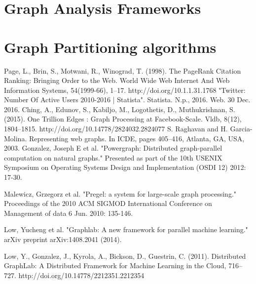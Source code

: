 \documentclass[12pt]{report}
\numberwithin{figure}{section}
\numberwithin{table}{section}
\begin{document}
\newpage
\begin{appendices}


\chapter{Graph Analysis Frameworks}



\chapter{Graph Partitioning algorithms}




\end{appendices}


\begin{thebibliography}{1}

   Page, L., Brin, S., Motwani, R.,  Winograd, T. (1998). The PageRank Citation Ranking: Bringing Order to the Web. World Wide Web Internet And Web Information Systems, 54(1999-66), 1–17. http://doi.org/10.1.1.31.1768
   "Twitter: Number Of Active Users 2010-2016 | Statista". Statista. N.p., 2016. Web. 30 Dec. 2016.
   Ching, A., Edunov, S., Kabiljo, M., Logothetis, D.,  Muthukrishnan, S. (2015). One Trillion Edges : Graph Processing at Facebook-Scale. Vldb, 8(12), 1804–1815. http://doi.org/10.14778/2824032.2824077
   S. Raghavan and H. Garcia-Molina. Representing web graphs. In ICDE, pages 405–416, Atlanta, GA, USA, 2003.
   Gonzalez, Joseph E et al. "Powergraph: Distributed graph-parallel computation on natural graphs." Presented as part of the 10th USENIX Symposium on Operating Systems Design and Implementation (OSDI 12) 2012: 17-30.

    Malewicz, Grzegorz et al. "Pregel: a system for large-scale graph processing." Proceedings of the 2010 ACM SIGMOD International Conference on Management of data 6 Jun. 2010: 135-146.

   Low, Yucheng et al. "Graphlab: A new framework for parallel machine learning." arXiv preprint arXiv:1408.2041 (2014).
  
   Low, Y., Gonzalez, J., Kyrola, A., Bickson, D.,  Guestrin, C. (2011). Distributed GraphLab: A Distributed Framework for Machine Learning in the Cloud, 716–727. http://doi.org/10.14778/2212351.2212354
  

\end{thebibliography}
\end{document}
